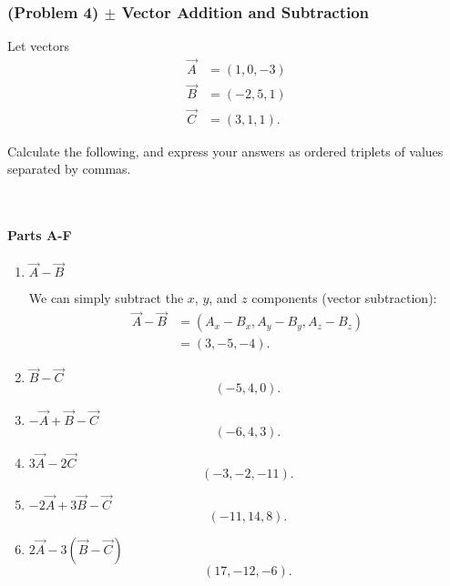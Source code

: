 \newpage

\subsubsection{(Problem 4) $\pm$ Vector Addition and Subtraction}

Let vectors
\begin{align*}
	\vec{A} &= \left( 1,0,-3 \right) \\
	\vec{B} &= \left( -2,5,1 \right) \\
	\vec{C} &= \left( 3,1,1 \right)
	.\end{align*}

Calculate the following, and express your answers as ordered triplets of values separated by commas.

~

\setcounter{partcounter}{6}
\paragraph{Parts A-F}

\begin{solution}
	\begin{enumerate}[label=\Alph*.]
		\item $\vec{A} - \vec{B}$

		      We can simply subtract the $x$, $y$, and $z$ components (vector subtraction):
		      \begin{align*}
			      \vec{A} - \vec{B} &= \left( A_{x} - B_{x}, A_{y} - B_{y}, A_{z} - B_{z} \right) \\
			      &= \left( 3,-5,-4 \right)
			      .\end{align*}

		\item $\vec{B} - \vec{C}$
		      \[
			      \left( -5,4,0 \right)
			      .\]
		\item $-\vec{A} + \vec{B} - \vec{C}$
		      \[
			      \left( -6, 4, 3 \right)
			      .\]

		\item $3 \vec{A} - 2 \vec{C}$
		      \[
			      \left( -3,-2,-11 \right)
			      .\]

		\item $-2 \vec{A} + 3 \vec{B} - \vec{C}$
		      \[
			      \left( -11,14,8 \right)
			      .\]
		\item $2 \vec{A} - 3 \left( \vec{B} - \vec{C} \right)$
		      \[
			      \left( 17,-12,-6 \right)
			      .\]
	\end{enumerate}
\end{solution}


